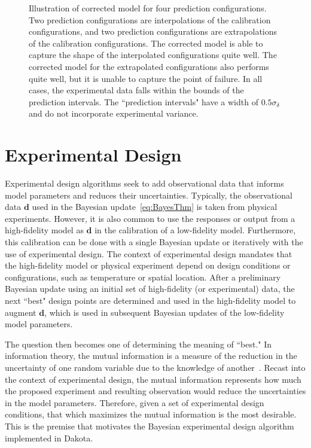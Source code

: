 \begin{figure}[htbp]
\begin{subfigmatrix}{2}
  \end{subfigmatrix}
  \caption{Illustration of corrected model for four prediction configurations.
  Two prediction configurations are interpolations of the calibration
configurations, and two prediction configurations are extrapolations of the
calibration configurations. The corrected model is able to capture the shape
of the interpolated configurations quite well. The corrected model for the 
extrapolated configurations also performs quite well, but it is unable to
capture the point of failure. In all cases, the experimental data falls within
the bounds of the prediction intervals. The ``prediction intervals" have a 
width of $0.5\sigma_{\delta}$ and do not incorporate experimental variance.}
\label{fig:mat_corr}
\end{figure}



\section{Experimental Design}
\label{uq:bayes_experimental_design}

Experimental design algorithms seek to add observational data that informs
model parameters and reduces their uncertainties. Typically, the observational 
data $\boldsymbol{d}$ used in the Bayesian update~\ref{eq:BayesThm} is taken
from physical experiments. However, it is also common to use the responses or
output from a high-fidelity model as $\boldsymbol{d}$ in the calibration of a
low-fidelity model. Furthermore, this calibration can be done with a single
Bayesian update or iteratively with the use of experimental design. The context
of experimental design mandates that the high-fidelity model or physical 
experiment depend on design conditions or configurations, such as temperature
or spatial location. After a preliminary Bayesian update using an initial set 
of high-fidelity (or experimental) data, the next ``best" design points are 
determined and used in the high-fidelity model to augment 
$\boldsymbol{d}$, which is used in subsequent Bayesian updates of the 
low-fidelity model parameters.

The question then becomes one of determining the meaning of ``best." In 
information theory, the mutual information is a measure of the reduction in the 
uncertainty of one random variable due to the knowledge of 
another~\cite{Cov2006}. Recast into the context of experimental design, the 
mutual information represents how much the proposed experiment and resulting 
observation would reduce the uncertainties in the model parameters. Therefore, 
given a set of experimental design conditions, that which maximizes the mutual 
information is the most desirable. This is the premise that motivates the 
Bayesian experimental design algorithm implemented in Dakota.

